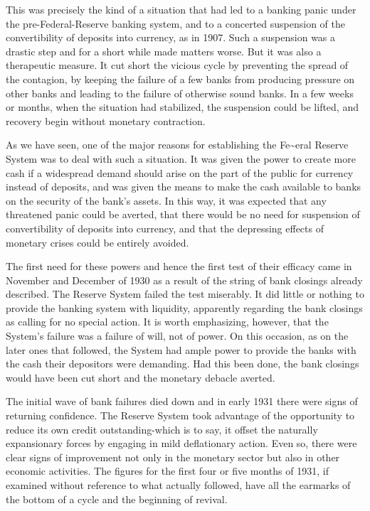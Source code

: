 \documentclass[11pt,openany]{book}
\begin{document}
This was precisely the kind of a situation that had led to a banking panic under the pre-Federal-Reserve banking system, and to a concerted suspension of the convertibility of deposits into currency, as in 1907. Such a suspension was a drastic step and for a short while made matters worse. But it was also a therapeutic measure. It cut short the vicious cycle by preventing the spread of the contagion, by keeping the failure of a few banks from producing pressure on other banks and leading to the failure of otherwise sound banks. In a few weeks or months, when the situation had stabilized, the suspension could be lifted, and recovery begin without monetary contraction.

As we have seen, one of the major reasons for establishing the Fe\textasciitilde{}eral Reserve System was to deal with such a situation. It was given the power to create more cash if a widespread demand should arise on the part of the public for currency instead of deposits, and was given the means to make the cash available to banks on the security of the bank's assets. In this way, it was expected that any threatened panic could be averted, that there would be no need for suspension of convertibility of deposits into currency, and that the depressing effects of monetary crises could be entirely avoided.

The first need for these powers and hence the first test of their efficacy came in November and December of 1930 as a result of the string of bank closings already described. The Reserve System failed the test miserably. It did little or nothing to provide the banking system with liquidity, apparently regarding the bank closings as calling for no special action. It is worth emphasizing, however, that the System's failure was a failure of will, not of power. On this occasion, as on the later ones that followed, the System had ample power to provide the banks with the cash their depositors were demanding. Had this been done, the bank closings would have been cut short and the monetary debacle averted.

The initial wave of bank failures died down and in early 1931 there were signs of returning confidence. The Reserve System took advantage of the opportunity to reduce its own credit outstanding-which is to say, it offset the naturally expansionary forces by engaging in mild deflationary action. Even so, there were clear signs of improvement not only in the monetary sector but also in other economic activities. The figures for the first four or five months of 1931, if examined without reference to what actually followed, have all the earmarks of the bottom of a cycle and the beginning of revival.
\end{document}
